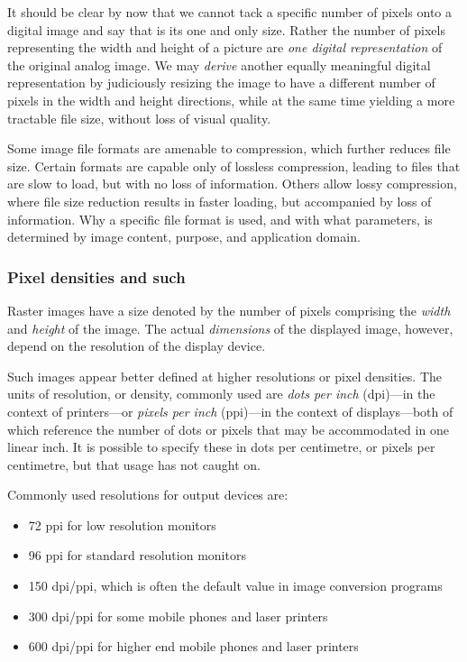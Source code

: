 \documentclass[
  11pt,
  british,
  a4paper,
]{article}
\providecommand{\tightlist}{%
  \setlength{\itemsep}{0pt}\setlength{\parskip}{0pt}}
\begin{document}
It should be clear by now that we cannot tack a specific number of
pixels onto a digital image and say that is its one and only size.
Rather the number of pixels representing the width and height of a
picture are \emph{one digital representation} of the original analog
image. We may \emph{derive} another equally meaningful digital
representation by judiciously resizing the image to have a different
number of pixels in the width and height directions, while at the same
time yielding a more tractable file size, without loss of visual
quality.

Some image file formats are amenable to compression, which further
reduces file size. Certain formats are capable only of lossless
compression, leading to files that are slow to load, but with no loss of
information. Others allow lossy compression, where file size reduction
results in faster loading, but accompanied by loss of information. Why a
specific file format is used, and with what parameters, is determined by
image content, purpose, and application domain.

\hypertarget{pixel-densities-and-such}{%
\subsubsection{Pixel densities and
such}\label{pixel-densities-and-such}}

Raster images have a size denoted by the number of pixels comprising the
\emph{width} and \emph{height} of the image. The actual
\emph{dimensions} of the displayed image, however, depend on the
resolution of the display device.

Such images appear better defined at higher resolutions or pixel
densities. The units of resolution, or density, commonly used are
\emph{dots per inch} (dpi)---in the context of printers---or
\emph{pixels per inch} (ppi)---in the context of displays---both of
which reference the number of dots or pixels that may be accommodated in
one linear inch. It is possible to specify these in dots per centimetre,
or pixels per centimetre, but that usage has not caught on.

Commonly used resolutions for output devices are:

\begin{itemize}
\tightlist
\item
  72 ppi for low resolution monitors
\item
  96 ppi for standard resolution monitors
\item
  150 dpi/ppi, which is often the default value in image conversion
  programs
\item
  300 dpi/ppi for some mobile phones and laser printers
\item
  600 dpi/ppi for higher end mobile phones and laser printers
\end{itemize}
\end{document}
